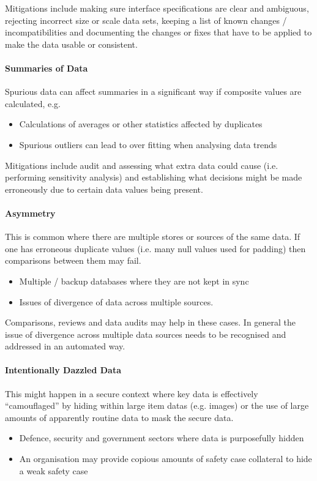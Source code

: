 Mitigations include making sure interface specifications are clear and ambiguous, rejecting incorrect size or scale data sets, keeping a list of known changes / incompatibilities and documenting the changes or fixes that have to be applied to make the data usable or consistent.

\paragraph{Summaries of Data}
Spurious data can affect summaries in a significant way if composite values are calculated, e.g.
\begin{itemize}
    \item Calculations of averages or other statistics affected by duplicates
    \item Spurious outliers can lead to over fitting when analysing data trends
\end{itemize}

Mitigations include audit and assessing what extra data could cause (i.e. performing sensitivity analysis) and establishing what decisions might be made erroneously due to certain data values being present.	

\paragraph{ Asymmetry}
This is common where there are multiple stores or sources of the same data. If one has erroneous duplicate values (i.e. many null values used for padding) then comparisons between them may fail.
\begin{itemize}
    \item Multiple / backup \glspl{database} where they are not kept in sync
    \item Issues of divergence of data across multiple sources.
\end{itemize}

Comparisons, reviews and data audits may help in these cases. In general the issue of divergence across multiple data sources needs to be recognised and addressed in an automated way.

\paragraph{Intentionally Dazzled Data}
This might happen in a secure context where key data is effectively ``camouflaged'' by hiding within large \glspl{item data} (e.g. images) or the use of large amounts of apparently routine data to mask the secure data.
\begin{itemize}
    \item Defence, security and government sectors where data is purposefully hidden 
    \item An organisation may provide copious amounts of safety case collateral to hide a weak safety case
\end{itemize}
